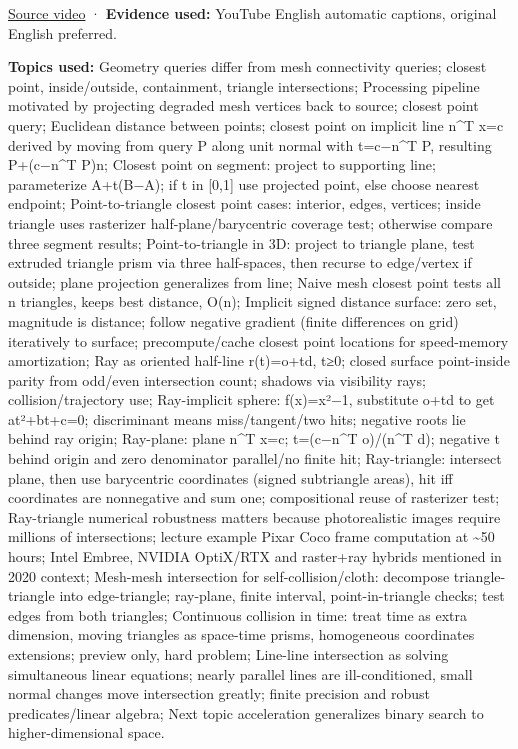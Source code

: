 \href{https://www.youtube.com/watch?v=GPPyUT9Pytw}{Source video} · \textbf{Evidence used:} YouTube English automatic captions, original English preferred.

\textbf{Topics used:} Geometry queries differ from mesh connectivity queries; closest point, inside/outside, containment, triangle intersections; Processing pipeline motivated by projecting degraded mesh vertices back to source; closest point query; Euclidean distance between points; closest point on implicit line n\^{}T x=c derived by moving from query P along unit normal with t=c−n\^{}T P, resulting P+(c−n\^{}T P)n; Closest point on segment: project to supporting line; parameterize A+t(B−A); if t in {[}0,1{]} use projected point, else choose nearest endpoint; Point-to-triangle closest point cases: interior, edges, vertices; inside triangle uses rasterizer half-plane/barycentric coverage test; otherwise compare three segment results; Point-to-triangle in 3D: project to triangle plane, test extruded triangle prism via three half-spaces, then recurse to edge/vertex if outside; plane projection generalizes from line; Naive mesh closest point tests all n triangles, keeps best distance, O(n); Implicit signed distance surface: zero set, magnitude is distance; follow negative gradient (finite differences on grid) iteratively to surface; precompute/cache closest point locations for speed-memory amortization; Ray as oriented half-line r(t)=o+td, t≥0; closed surface point-inside parity from odd/even intersection count; shadows via visibility rays; collision/trajectory use; Ray-implicit sphere: f(x)=\textbar\textbar x\textbar\textbar²−1, substitute o+td to get at²+bt+c=0; discriminant means miss/tangent/two hits; negative roots lie behind ray origin; Ray-plane: plane n\^{}T x=c; t=(c−n\^{}T o)/(n\^{}T d); negative t behind origin and zero denominator parallel/no finite hit; Ray-triangle: intersect plane, then use barycentric coordinates (signed subtriangle areas), hit iff coordinates are nonnegative and sum one; compositional reuse of rasterizer test; Ray-triangle numerical robustness matters because photorealistic images require millions of intersections; lecture example Pixar Coco frame computation at \textasciitilde50 hours; Intel Embree, NVIDIA OptiX/RTX and raster+ray hybrids mentioned in 2020 context; Mesh-mesh intersection for self-collision/cloth: decompose triangle-triangle into edge-triangle; ray-plane, finite interval, point-in-triangle checks; test edges from both triangles; Continuous collision in time: treat time as extra dimension, moving triangles as space-time prisms, homogeneous coordinates extensions; preview only, hard problem; Line-line intersection as solving simultaneous linear equations; nearly parallel lines are ill-conditioned, small normal changes move intersection greatly; finite precision and robust predicates/linear algebra; Next topic acceleration generalizes binary search to higher-dimensional space.

